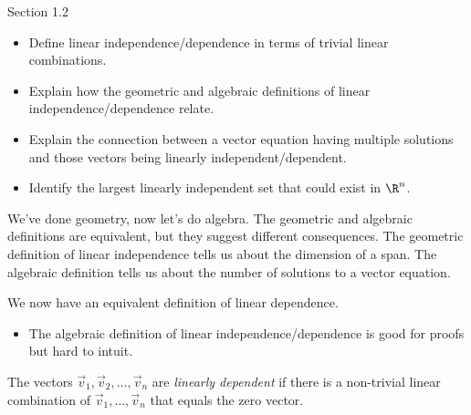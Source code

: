 \documentclass{problemset}
\begin{document}
\begin{lesson}

	Section 1.2

	\begin{itemize}
		\item Define linear independence/dependence in terms of trivial linear combinations.
		\item Explain how the geometric and algebraic definitions of linear independence/dependence relate.
		\item Explain the connection between a vector equation having multiple
			solutions and those vectors being linearly independent/dependent.
		\item Identify the largest linearly independent set that could exist in $\R^n$.
	\end{itemize}

	We've done geometry, now let's do algebra. The geometric and algebraic definitions
	are equivalent, but they suggest different consequences. The geometric definition
	of linear independence tells us about the dimension of a span. The algebraic
	definition tells us about the number of solutions to a vector equation.

\end{lesson}

	We now have an equivalent definition of linear dependence.
	\begin{annotation}
		\begin{notes}
			\begin{itemize}
				\item The algebraic definition of linear independence/dependence
					is good for proofs but hard to intuit.
			\end{itemize}
		\end{notes}
	\end{annotation}

	\begin{definition}
	The vectors $\vec v_1,\vec v_2,\ldots,\vec v_n$ are
	\emph{linearly dependent} if there is a non-trivial
	linear combination of $\vec v_1,\ldots,\vec v_n$ that
	equals the zero vector.
	\end{definition}
\end{document}
